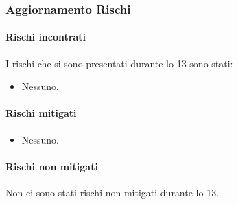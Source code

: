 \subsubsection{Aggiornamento Rischi}
\label{sec:aggiornamento_rischi_sprint13}

\paragraph{Rischi incontrati}
\label{par:rischi_incontrati_sprint13}
I rischi che si sono presentati durante lo  13 sono stati:
\begin{itemize}
    \item Nessuno.
\end{itemize}

\paragraph{Rischi mitigati}
\label{par:rischi_mitigati_sprint13}
\begin{itemize}
    \item Nessuno.
\end{itemize}

\paragraph{Rischi non mitigati}
\label{par:rischi_non_mitigati_sprint13}
Non ci sono stati rischi non mitigati durante lo  13.